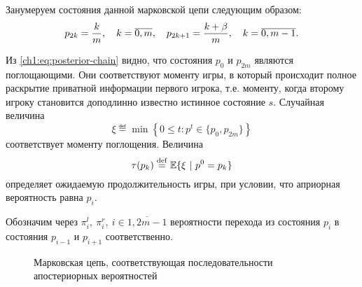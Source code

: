 {Занумеруем состояния данной марковской цепи следующим образом:
\begin{gather*}
  p_{2k} = \frac{k}{m}, \quad k = \overline{0, m}, \quad
  p_{2k+1} = \frac{k+\beta}{m}, \quad k = \overline{0, m-1}.
\end{gather*}

Из \eqref{ch1:eq:posterior-chain} видно, что состояния $p_0$ и $p_{2m}$ являются поглощающими.
Они соответствуют моменту игры, в который происходит полное раскрытие приватной информации первого игрока, т.е. моменту, когда второму игроку становится доподлинно известно истинное состояние $s$.
Случайная величина
\begin{equation*}
  \xi \eqdef \min \left\{ 0 \leq t: p^t \in \{p_0, p_{2m}\} \right\}
\end{equation*}
соответствует моменту поглощения. Величина
\begin{equation*}
  \tau(p_k) \overset{\mathrm{def}}{=} \operatorname{\mathbb{E}} \{ \xi\ |\ p^0 = p_k \}
\end{equation*}
определяет ожидаемую продолжительность игры, при условии, что априорная вероятность равна $p_i$.

Обозначим через $\pi^l_i,\ \pi^r_i,\ i \in \overline{1, 2m-1}$ вероятности перехода из состояния $p_i$ в состояния $p_{i-1}$ и $p_{i+1}$ соответственно.

\begin{figure}[tb]
  \centering
  
  \caption[Последовательность апостериорных вероятностей]{Марковская цепь,
    соответствующая последовательности апостериорных вероятностей}
  \label{ch1:fig:posterior-markov}
\end{figure}

}

